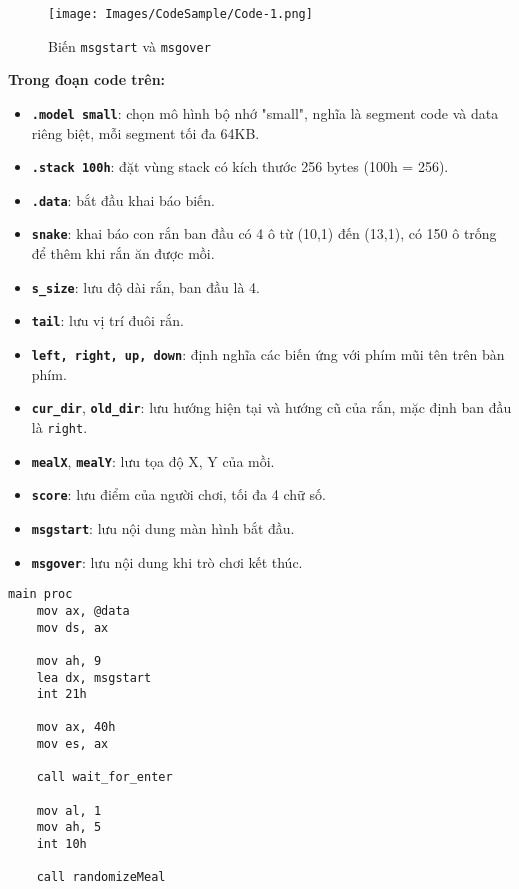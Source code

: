 \vspace{0.4cm}
\begin{figure}[H]
    \centering
    \texttt{[image: Images/CodeSample/Code-1.png]}
    \caption{Biến \texttt{msgstart} và \texttt{msgover}}
    \label{fig:codesample-1}
\end{figure}

\vspace{0.4cm}
\noindent \textbf{Trong đoạn code trên:}
\begin{itemize}
    \itemsep0.2cm
    \item \textbf{\texttt{.model small}}: chọn mô hình bộ nhớ "small", nghĩa là segment code và data riêng biệt, mỗi segment tối đa 64KB.
    \item \textbf{\texttt{.stack 100h}}: đặt vùng stack có kích thước 256 bytes (100h = 256).
    \item \textbf{\texttt{.data}}: bắt đầu khai báo biến.
    \item \textbf{\texttt{snake}}: khai báo con rắn ban đầu có 4 ô từ (10,1) đến (13,1), có 150 ô trống để thêm khi rắn ăn được mồi.
    \item \textbf{\texttt{s\_size}}: lưu độ dài rắn, ban đầu là 4.
    \item \textbf{\texttt{tail}}: lưu vị trí đuôi rắn.
    \item \textbf{\texttt{left, right, up, down}}: định nghĩa các biến ứng với phím mũi tên trên bàn phím.
    \item \textbf{\texttt{cur\_dir}}, \textbf{\texttt{old\_dir}}: lưu hướng hiện tại và hướng cũ của rắn, mặc định ban đầu là \texttt{right}.
    \item \textbf{\texttt{mealX}}, \textbf{\texttt{mealY}}: lưu tọa độ X, Y của mồi.
    \item \textbf{\texttt{score}}: lưu điểm của người chơi, tối đa 4 chữ số.
    \item \textbf{\texttt{msgstart}}: lưu nội dung màn hình bắt đầu.
    \item \textbf{\texttt{msgover}}: lưu nội dung khi trò chơi kết thúc.
\end{itemize}

\vspace{0.5cm}

\begin{lstlisting}[style=asm]
    main proc
    mov ax, @data
    mov ds, ax
                                     
    mov ah, 9   
    lea dx, msgstart                             
    int 21h  
                                    
    mov ax, 40h   
    mov es, ax    

    call wait_for_enter     

    mov al, 1     
    mov ah, 5      
    int 10h            
    
    call randomizeMeal
\end{lstlisting}

